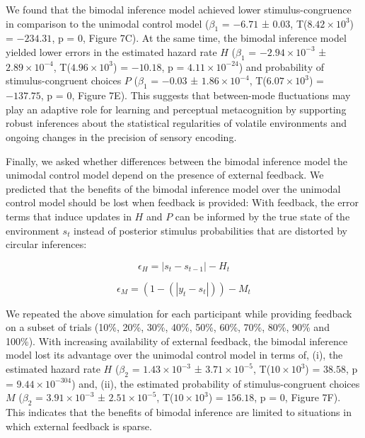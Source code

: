 \documentclass[
]{article}
\begin{document}
We found that the bimodal inference model achieved lower
stimulus-congruence in comparison to the unimodal control model
(\(\beta_1\) = \(-6.71\) ± \(0.03\),
T(\(\ensuremath{8.42\times 10^{3}}\)) = \(-234.31\), p = \(0\), Figure
7C). At the same time, the bimodal inference model yielded lower errors
in the estimated hazard rate \(H\) (\(\beta_1\) =
\(\ensuremath{-2.94\times 10^{-3}}\) ±
\(\ensuremath{2.89\times 10^{-4}}\),
T(\(\ensuremath{4.96\times 10^{3}}\)) = \(-10.18\), p =
\(\ensuremath{4.11\times 10^{-24}}\)) and probability of
stimulus-congruent choices \(P\) (\(\beta_1\) = \(-0.03\) ±
\(\ensuremath{1.86\times 10^{-4}}\),
T(\(\ensuremath{6.07\times 10^{3}}\)) = \(-137.75\), p = \(0\), Figure
7E). This suggests that between-mode fluctuations may play an adaptive
role for learning and perceptual metacognition by supporting robust
inferences about the statistical regularities of volatile environments
and ongoing changes in the precision of sensory encoding.

Finally, we asked whether differences between the bimodal inference
model the unimodal control model depend on the presence of external
feedback. We predicted that the benefits of the bimodal inference model
over the unimodal control model should be lost when feedback is
provided: With feedback, the error terms that induce updates in \(H\)
and \(P\) can be informed by the true state of the environment \(s_t\)
instead of posterior stimulus probabilities that are distorted by
circular inferences:

\begin{equation}
\epsilon_H = |s_t - s_{t-1}| - H_t
\end{equation}

\begin{equation}
\epsilon_M = (1- (|y_t - s_t|)) - M_t
\end{equation}

We repeated the above simulation for each participant while providing
feedback on a subset of trials (10\%, 20\%, 30\%, 40\%, 50\%, 60\%,
70\%, 80\%, 90\% and 100\%). With increasing availability of external
feedback, the bimodal inference model lost its advantage over the
unimodal control model in terms of, (i), the estimated hazard rate \(H\)
(\(\beta_2\) = \(\ensuremath{1.43\times 10^{-3}}\) ±
\(\ensuremath{3.71\times 10^{-5}}\), T(\(\ensuremath{10\times 10^{3}}\))
= \(38.58\), p = \(\ensuremath{9.44\times 10^{-304}}\)) and, (ii), the
estimated probability of stimulus-congruent choices \(M\) (\(\beta_2\) =
\(\ensuremath{3.91\times 10^{-3}}\) ±
\(\ensuremath{2.51\times 10^{-5}}\), T(\(\ensuremath{10\times 10^{3}}\))
= \(156.18\), p = \(0\), Figure 7F). This indicates that the benefits of
bimodal inference are limited to situations in which external feedback
is sparse.
\end{document}
